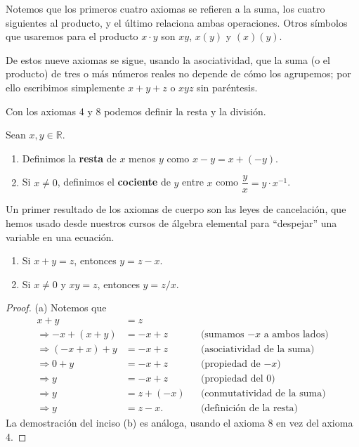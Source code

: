 \documentclass[12pt,a4paper]{book}
\begin{document}
  Notemos que los primeros cuatro axiomas se refieren a la suma, los cuatro siguientes al producto, y el último relaciona ambas operaciones. Otros símbolos que usaremos para el producto $x\cdot y$ son $xy$, $x(y)$ y $(x)(y)$.
  
  De estos nueve axiomas se sigue, usando la asociatividad, que la suma (o el producto) de tres o más números reales no depende de cómo los agrupemos; por ello escribimos simplemente $x+y+z$ o $xyz$ sin paréntesis.
  
  Con los axiomas 4 y 8 podemos definir la resta y la división.
  
  \begin{definicion}
    Sean $x,y \in \mathbb{R}$.
    \begin{enumerate}[label=(\alph*)]
      \item Definimos la \textbf{resta} de $x$ menos $y$ como $x-y = x+(-y)$.
      \item Si $x \neq 0$, definimos el \textbf{cociente} de $y$ entre $x$ como $\dfrac{y}{x} = y \cdot x^{-1}$.
    \end{enumerate}
  \end{definicion}
  
  Un primer resultado de los axiomas de cuerpo son las leyes de cancelación, que hemos usado desde nuestros cursos de álgebra elemental para ``despejar'' una variable en una ecuación.
  
  \begin{proposicion}
    \begin{enumerate}[label=(\alph*)]
      \item Si $x+y=z$, entonces $y=z-x$.
      \item Si $x \neq 0$ y $xy=z$, entonces $y = z/x$.
    \end{enumerate}
  \end{proposicion}
  
  \begin{proof}
    (a) Notemos que
    \begin{align*}
      x+y                  & =z                                                \\
      \Rightarrow -x+(x+y) & = -x+z   &  & \text{(sumamos $-x$ a ambos lados)} \\
      \Rightarrow (-x+x)+y & = -x+z   &  & \text{(asociatividad de la suma)}   \\
      \Rightarrow 0+y      & = -x+z   &  & \text{(propiedad de $-x$)}          \\
      \Rightarrow y        & = -x+z   &  & \text{(propiedad del $0$)}          \\
      \Rightarrow y        & = z+(-x) &  & \text{(conmutatividad de la suma)}  \\
      \Rightarrow y        & = z-x.   &  & \text{(definición de la resta)}
    \end{align*}
    La demostración del inciso (b) es análoga, usando el axioma 8 en vez del axioma 4.
  \end{proof}
  
\end{document}
